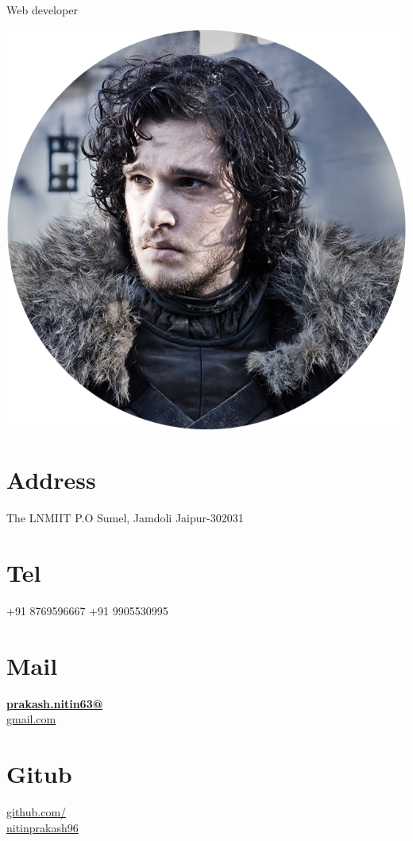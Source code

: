 \documentclass[]{friggeri-cv}
\begin{document}
      {Web developer}
      

\begin{aside}
  \includegraphics[scale=0.18]{img/snow_circle.png}
  \section{Address}
    The LNMIIT
    P.O Sumel, Jamdoli
    Jaipur-302031
    ~
  \section{Tel}
    +91 8769596667
    +91 9905530995
    ~
  \section{Mail}
    \href{mailto: prakash.nitin63@gmail.com}{\textbf{prakash.nitin63@}\\gmail.com}
    ~
  \section{Gitub}
    \href{https://github.com/mygit}{github.com/\\nitinprakash96}
    ~

\end{aside}
\end{document}
